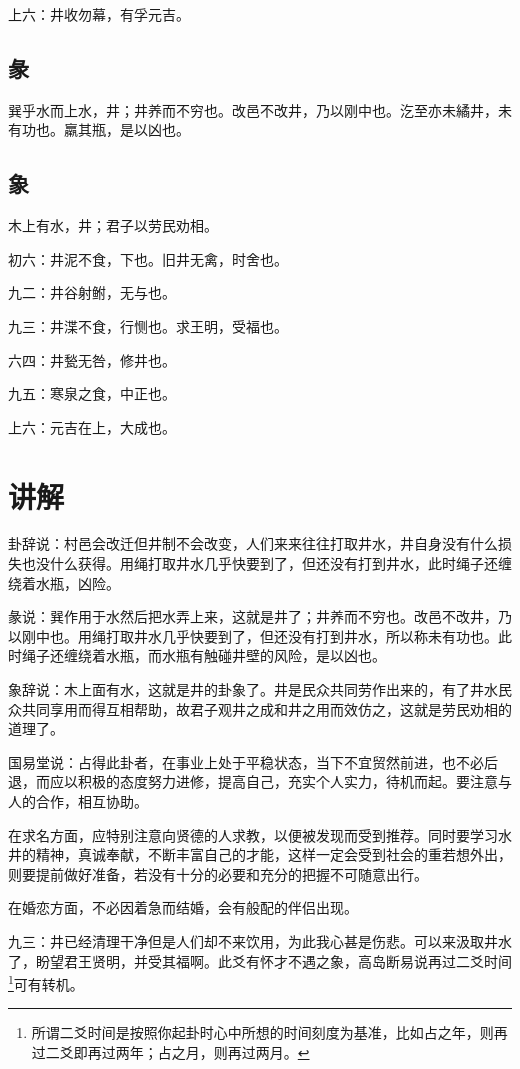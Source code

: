 \documentclass[12pt,oneside]{book}
\begin{document}
上六：井收勿幕，有孚元吉。

\subsection{彖}
巽乎水而上水，井；井养而不穷也。改邑不改井，乃以刚中也。汔至亦未繘井，未有功也。羸其瓶，是以凶也。

\subsection{象}
木上有水，井；君子以劳民劝相。

初六：井泥不食，下也。旧井无禽，时舍也。

九二：井谷射鲋，无与也。

九三：井渫不食，行恻也。求王明，受福也。

六四：井甃无咎，修井也。

九五：寒泉之食，中正也。

上六：元吉在上，大成也。

\section{讲解}
卦辞说：村邑会改迁但井制不会改变，人们来来往往打取井水，井自身没有什么损失也没什么获得。用绳打取井水几乎快要到了，但还没有打到井水，此时绳子还缠绕着水瓶，凶险。

彖说：巽作用于水然后把水弄上来，这就是井了；井养而不穷也。改邑不改井，乃以刚中也。用绳打取井水几乎快要到了，但还没有打到井水，所以称未有功也。此时绳子还缠绕着水瓶，而水瓶有触碰井壁的风险，是以凶也。

象辞说：木上面有水，这就是井的卦象了。井是民众共同劳作出来的，有了井水民众共同享用而得互相帮助，故君子观井之成和井之用而效仿之，这就是劳民劝相的道理了。

国易堂说：占得此卦者，在事业上处于平稳状态，当下不宜贸然前进，也不必后退，而应以积极的态度努力进修，提高自己，充实个人实力，待机而起。要注意与人的合作，相互协助。

在求名方面，应特别注意向贤德的人求教，以便被发现而受到推荐。同时要学习水井的精神，真诚奉献，不断丰富自己的才能，这样一定会受到社会的重若想外出，则要提前做好准备，若没有十分的必要和充分的把握不可随意出行。

在婚恋方面，不必因着急而结婚，会有般配的伴侣出现。

九三：井已经清理干净但是人们却不来饮用，为此我心甚是伤悲。可以来汲取井水了，盼望君王贤明，并受其福啊。此爻有怀才不遇之象，高岛断易说再过二爻时间\footnote{所谓二爻时间是按照你起卦时心中所想的时间刻度为基准，比如占之年，则再过二爻即再过两年；占之月，则再过两月。}可有转机。
\end{document}
